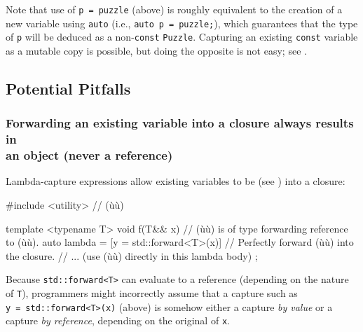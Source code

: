 \noindent Note that use of \lstinline!p!~\lstinline!=!~\lstinline!puzzle! (above) is
roughly equivalent to the creation of a new variable using
\lstinline!auto! (i.e.,
\lstinline!auto!~\lstinline!p!~\lstinline!=!~\lstinline!puzzle;!), which guarantees
that the type of \lstinline!p! will be deduced as a non-\lstinline!const!
\lstinline!Puzzle!. Capturing an existing \lstinline!const! variable as a mutable copy is
possible, but doing the opposite is not easy; see .

\subsection[Potential Pitfalls]{Potential Pitfalls}\label{potential-pitfalls-lambdacapture}

\subsubsection[Forwarding an existing variable into a closure always results in an object (never a reference)]{Forwarding an existing variable into a closure always results in\\ an object (never a reference)}\label{forwarding-an-existing-variable-into-a-closure-always-results-in-an-object-(never-a-reference)}

Lambda-capture expressions allow existing variables to be
 (see )
into a closure:

\begin{emcppslisting}[emcppsstandards={c++14}]
#include <utility>  // (ù{}ù)

template <typename T>
void f(T&& x)  // (ù{}ù) is of type forwarding reference to (ù{}ù).
{
    auto lambda = [y = std::forward<T>(x)]
        // Perfectly forward (ù{}ù) into the closure.
    {
        // ... (use (ù{}ù) directly in this lambda body)
    };
}
\end{emcppslisting}

\noindent Because \lstinline!std::forward<T>! can evaluate to a reference (depending
on the nature of \lstinline!T!), programmers might incorrectly assume that
a capture such as \lstinline!y!~\lstinline!=!~\lstinline!std::forward<T>(x)!
(above) is somehow either a capture \emph{by value} or a capture
\emph{by reference}, depending on the original 
of \lstinline!x!.

